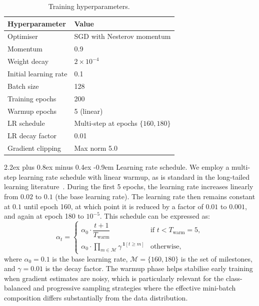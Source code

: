 \documentclass[12pt,a4paper]{article}
\makeatletter
\renewcommand{\paragraph}{\@startsection{paragraph}{4}{\z@}%
  {2.2ex plus 0.8ex minus 0.4ex}%
  {-0.9em}%
  {\normalfont\normalsize\bfseries}}
\makeatother
\begin{document}
\begin{table}[H]
    \centering
    \caption{Training hyperparameters.}
    \label{tab:training_config}
    \begin{tabular}{ll}
        \toprule
        \textbf{Hyperparameter} & \textbf{Value} \\
        \midrule
        Optimiser           & SGD with Nesterov momentum \\
        Momentum            & 0.9 \\
        Weight decay        & $2 \times 10^{-4}$ \\
        Initial learning rate & 0.1 \\
        Batch size          & 128 \\
        Training epochs     & 200 \\
        Warmup epochs       & 5 (linear) \\
        LR schedule         & Multi-step at epochs $\{160, 180\}$ \\
        LR decay factor     & 0.01 \\
        Gradient clipping   & Max norm 5.0 \\
        \bottomrule
    \end{tabular}
\end{table}

\paragraph{Learning rate schedule.} We employ a multi-step learning rate schedule with linear warmup, as is standard in the long-tailed learning literature~\citep{cao2019learning, zhang2023deep}. During the first 5 epochs, the learning rate increases linearly from $0.02$ to $0.1$ (the base learning rate). The learning rate then remains constant at $0.1$ until epoch 160, at which point it is reduced by a factor of $0.01$ to $0.001$, and again at epoch 180 to $10^{-5}$. This schedule can be expressed as:
\begin{equation}
    \alpha_t = \begin{cases}
        \alpha_0 \cdot \dfrac{t+1}{T_{\mathrm{warm}}} & \text{if } t < T_{\mathrm{warm}} = 5, \\[6pt]
        \alpha_0 \cdot \displaystyle\prod_{m \in \mathcal{M}} \gamma^{\,\mathbf{1}[t \geq m]} & \text{otherwise},
    \end{cases}
    \label{eq:lr_schedule}
\end{equation}
where $\alpha_0 = 0.1$ is the base learning rate, $\mathcal{M} = \{160, 180\}$ is the set of milestones, and $\gamma = 0.01$ is the decay factor. The warmup phase helps stabilise early training when gradient estimates are noisy, which is particularly relevant for the class-balanced and progressive sampling strategies where the effective mini-batch composition differs substantially from the data distribution.
\end{document}
